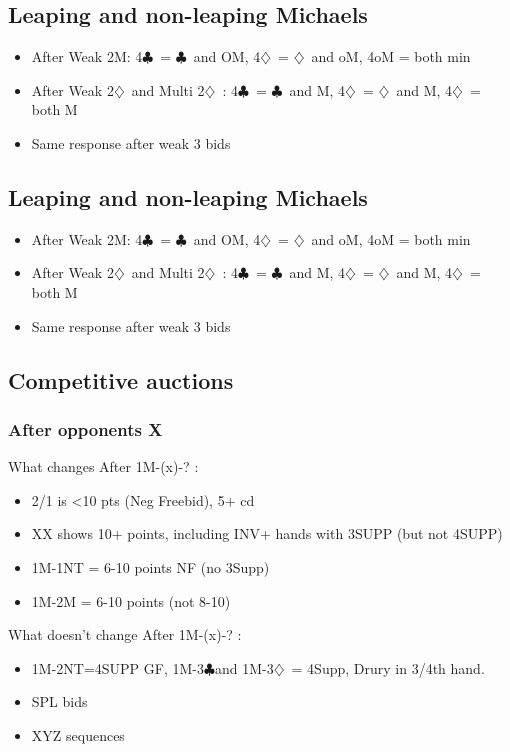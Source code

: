 \documentclass{article}
\newcommand\C{\ensuremath{\clubsuit}}
\newcommand\D{\ensuremath{\diamondsuit}}
\begin{document}
\begin{multicols}{2}
 \subsection{Leaping and non-leaping Michaels }
 \label{leaping}
 \begin{itemize}
   \item After Weak 2M: 4\C\ = \C\ and OM, 4\D\ = \D\ and oM, 4oM = both min
   \item After Weak 2\D\ and Multi 2\D\ : 4\C\ = \C\ and M, 4\D\ = \D\ and M, 4\D\ = both M
   \item  Same response after weak 3 bids
 \end{itemize}
 \subsection{Leaping and non-leaping Michaels }
 \label{leaping}
 \begin{itemize}
   \item After Weak 2M: 4\C\ = \C\ and OM, 4\D\ = \D\ and oM, 4oM = both min
   \item After Weak 2\D\ and Multi 2\D\ : 4\C\ = \C\ and M, 4\D\ = \D\ and M, 4\D\ = both M
   \item  Same response after weak 3 bids
 \end{itemize}
  \subsection{Competitive auctions}
  \label{comp}
  \subsubsection{After opponents X}
  What changes After 1M-(x)-?  :
  \begin{itemize}
    \item 2/1 is <10 pts (Neg Freebid), 5+ cd
    \item XX shows 10+ points, including INV+ hands with 3SUPP (but not 4SUPP)
    \item 1M-1NT = 6-10 points NF (no 3Supp)
    \item 1M-2M = 6-10 points (not 8-10)
  \end{itemize}
  What doesn't change After 1M-(x)-?  :
  \begin{itemize}
    \item 1M-2NT=4SUPP GF, 1M-3\C and 1M-3\D\ = 4Supp, Drury in 3/4th hand. 
    \item SPL bids
    \item XYZ sequences
  \end{itemize}

\end{multicols}
\end{document}
